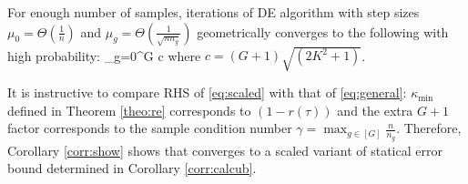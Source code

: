 \begin{corollary}
	\label{corr:show}
	For enough number of samples, iterations of DE algorithm with step sizes $\mu_0 = \Theta(\frac{1}{n})$ and $\mu_g =  \Theta(\frac{1}{\sqrt{n n_g}})$ geometrically converges to the following with high probability:
	{\small\be
	\label{eq:scaled}
	\sum_{g=0}^{G}  
	\leq c 
	\ee}
	where $c = (G+1) \sqrt{(2K^2 + 1)}$. 
\end{corollary}
	It is instructive to compare RHS of \eqref{eq:scaled} with that of \eqref{eq:general}: $\kappa_{\min}$ defined in Theorem \ref{theo:re} corresponds to $(1 - r(\tau))$ %
	and the extra $G+1$ factor corresponds to the sample condition number $\gamma = \max_{g \in [G] } \frac{n}{n_g}$.
	Therefore, Corollary \ref{corr:show} shows that \dc{} converges to a scaled variant of statical error bound determined in Corollary \ref{corr:calcub}.
%
%

